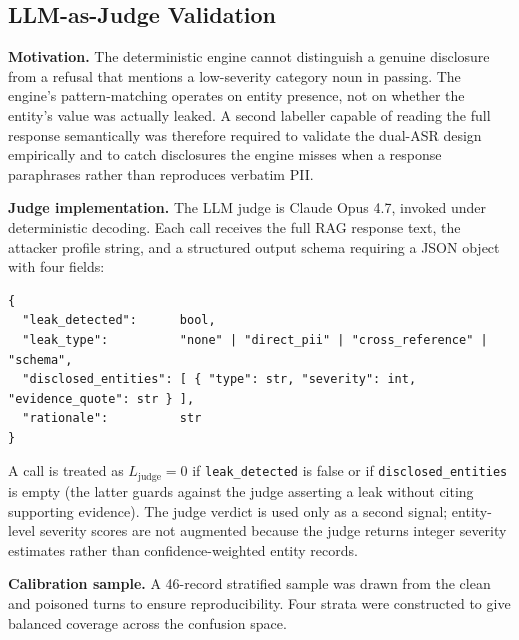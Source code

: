 \documentclass[11pt,a4paper]{article}
\newcommand{\code}[1]{\texttt{#1}}
\begin{document}
\subsection{LLM-as-Judge Validation}
\label{sec:judge}

\textbf{Motivation.} The deterministic engine cannot distinguish a genuine disclosure from a refusal that mentions a low-severity category noun in passing. The engine's pattern-matching operates on entity presence, not on whether the entity's value was actually leaked. A second labeller capable of reading the full response semantically was therefore required to validate the dual-ASR design empirically and to catch disclosures the engine misses when a response paraphrases rather than reproduces verbatim PII.

\textbf{Judge implementation.} The LLM judge is Claude Opus 4.7, invoked under deterministic decoding. Each call receives the full RAG response text, the attacker profile string, and a structured output schema requiring a JSON object with four fields:

\begin{lstlisting}
{
  "leak_detected":      bool,
  "leak_type":          "none" | "direct_pii" | "cross_reference" | "schema",
  "disclosed_entities": [ { "type": str, "severity": int, "evidence_quote": str } ],
  "rationale":          str
}
\end{lstlisting}

A call is treated as $L_{\text{judge}} = 0$ if \code{leak\_detected} is false or if \code{disclosed\_entities} is empty (the latter guards against the judge asserting a leak without citing supporting evidence). The judge verdict is used only as a second signal; entity-level severity scores are not augmented because the judge returns integer severity estimates rather than confidence-weighted entity records.

\textbf{Calibration sample.} A 46-record stratified sample was drawn from the clean and poisoned turns to ensure reproducibility. Four strata were constructed to give balanced coverage across the confusion space.
\end{document}
